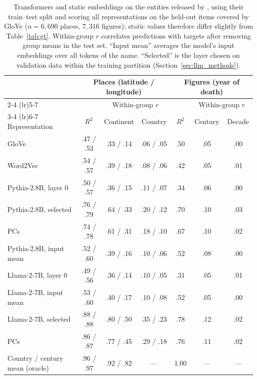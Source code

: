 \documentclass[11pt]{article}
\begin{document}
\begin{table}[t]
  \centering
  \caption{Transformers and static embeddings on the entities released by
  \citet{gurnee2024language}, using their train--test split and scoring all
  representations on the held-out items covered by GloVe ($n = 6{,}690$ places, $7{,}316$
  figures); static values therefore differ slightly from Table~\ref{tab:gt}. Within-group
  $r$ correlates predictions with targets after removing group means in the test set.
  ``Input mean'' averages the model's input embeddings over all tokens of the name.
  ``Selected'' is the layer chosen on validation data within
  the training partition (Section~\ref{sec:llm_methods}).}
  \label{tab:gt_pythia}
  \footnotesize
  \begin{tabular}{lcccccc}
    \toprule
    & \multicolumn{3}{c}{Places (latitude / longitude)} & \multicolumn{3}{c}{Figures (year of death)} \\
    \cmidrule(lr){2-4} \cmidrule(lr){5-7}
    & & \multicolumn{2}{c}{Within-group $r$} & & \multicolumn{2}{c}{Within-group $r$} \\
    \cmidrule(lr){3-4} \cmidrule(lr){6-7}
    Representation & $R^2$ & Continent & Country & $R^2$ & Century & Decade \\
    \midrule
    GloVe                  & .47 / .53 & .33 / .14 & .06 / .05 & .50 & .05 & .00 \\
    Word2Vec               & .54 / .57 & .39 / .18 & .08 / .06 & .42 & .05 & .01 \\
    Pythia-2.8B, layer 0   & .50 / .57 & .36 / .15 & .11 / .07 & .34 & .06 & .00 \\
    Pythia-2.8B, selected  & .76 / .79 & .64 / .33 & .20 / .12 & .70 & .10 & .03 \\
    \quad 300 PCs          & .74 / .78 & .61 / .31 & .18 / .10 & .67 & .10 & .02 \\
    Pythia-2.8B, input mean & .52 / .60 & .39 / .16 & .10 / .06 & .52 & .08 & .00 \\
    Llama-2-7B, layer 0    & .49 / .56 & .36 / .14 & .10 / .05 & .31 & .05 & .01 \\
    Llama-2-7B, input mean & .53 / .60 & .40 / .17 & .10 / .08 & .52 & .05 & .00 \\
    Llama-2-7B, selected   & .88 / .88 & .80 / .50 & .35 / .23 & .78 & .12 & .02 \\
    \quad 300 PCs          & .86 / .87 & .77 / .45 & .29 / .18 & .76 & .11 & .02 \\
    \midrule
    Country / century mean (oracle) & .96 / .97 & .92 / .82 & --- & 1.00 & --- & --- \\
    \bottomrule
  \end{tabular}
\end{table}
\end{document}
